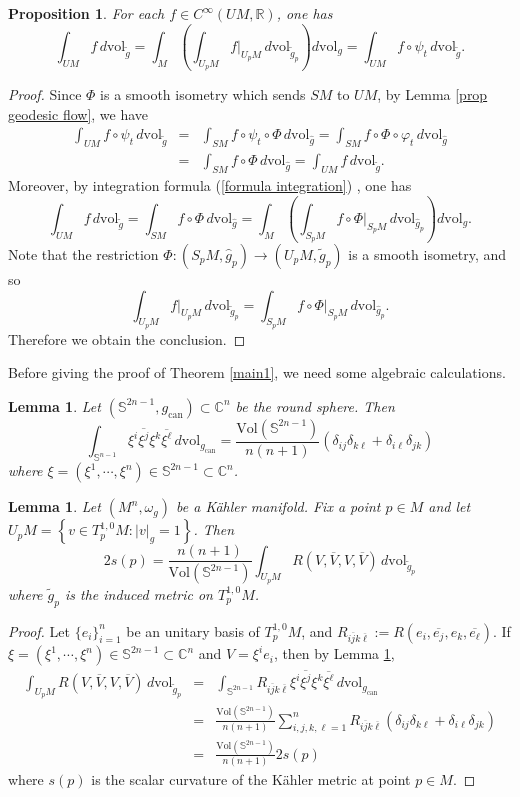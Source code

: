 \documentclass[12pt]{amsart}
\theoremstyle{plain}
\newtheorem{lemma}[thm]{Lemma}
\newtheorem{prop}[thm]{Proposition}
\theoremstyle{definition}
\newcommand{\bproposition}{\begin{prop}}
\newcommand{\eproposition}{\end{prop}}
\newcommand{\bproof}{\begin{proof}}
\newcommand{\eproof}{\end{proof}}
\newcommand{\elemma}{\end{lemma}}
\newcommand{\blemma}{\begin{lemma}}
\renewcommand{\bar}{\overline}
\renewcommand{\phi}{\varphi}
\newcommand{\beq}{\begin{equation}}
\newcommand{\eeq}{\end{equation}}
\newcommand{\ee}{\end{eqnarray*}}
\newcommand{\be}{\begin{eqnarray*}}
\renewcommand{\hat}{\widehat}
\renewcommand{\tilde}{\widetilde}
\renewcommand{\S}{{\mathbb S}}
\renewcommand{\>}{\rightarrow}
\newcommand{\C}{{\mathbb C}}
\newcommand{\R}{{\mathbb R}}
\newcommand{\om}{\omega}
\numberwithin{equation}{section} %
\begin{document}
	
	
	\bproposition\label{complex integration}
	For each $f\in C^\infty(UM, \R)$, one has 
	\beq 
	\int_{UM}f\,d\mathrm{vol}_{\tilde g}=\int_M\left( \int_{U_pM} \left.f\right|_{U_pM}\,d\mathrm{vol}_{\tilde g_p} \right)d\mathrm{vol}_g=\int_{UM}f \circ \psi_t \,d\mathrm{vol}_{\tilde g}.
	\label{formula complex geodesic flow}
	\eeq 
	\eproposition
	
	\bproof
	Since $\Phi$ is a smooth isometry which sends $SM$ to $UM$, by Lemma \ref{prop geodesic flow}, we have
	\be
	\int_{UM}f \circ \psi_t \,d\mathrm{vol}_{\tilde g}
	&=& \int_{SM} f \circ \psi_t \circ\Phi\,d\mathrm{vol}_{\hat g}
	=\int_{SM} f \circ \Phi\circ\phi_t \,d\mathrm{vol}_{\hat g}\\
	&=& \int_{SM} f \circ \Phi \,d\mathrm{vol}_{\hat g}
	= \int_{UM} f  \,d\mathrm{vol}_{\tilde g}.
	\ee
	Moreover, by  integration formula (\ref{formula integration}) , one has 
	\[ 
	\int_{UM} f  \,d\mathrm{vol}_{\tilde g}  
	=\int_{SM} f \circ \Phi \,d\mathrm{vol}_{\hat g}
	=\int_M \left(\int_{S_pM} \left.f\circ \Phi\right|_{S_pM}\,d\mathrm{vol}_{\hat g_p}\right) d\mathrm{vol}_g.
	\] 
	Note   that the restriction $\Phi:(S_pM,\hat g_p)\to (U_pM,\tilde g_p)$ is a smooth isometry, and so
	\[
	\int_{U_pM} \left.f\right|_{U_pM}\,d\mathrm{vol}_{\tilde g_p}
	=\int_{S_pM} \left.f\circ \Phi\right|_{S_pM}\,d\mathrm{vol}_{\hat g_p}.
	\] 
	Therefore we obtain the conclusion.
	\eproof
	
	
	
	\noindent Before giving the proof of Theorem \ref{main1}, we need some  algebraic calculations. 
	
	\blemma\label{lem average}
	Let $(\S^{2n-1},g_{\mathrm{can}})\subset\C^n$ be the round sphere. Then 
	\[ 
	\int_{\S^{n-1}} \xi^i\bar{\xi^j}\xi^k\bar{\xi^\ell}\,d\mathrm{vol}_{g_{\mathrm{can}}}=\frac{\mathrm{Vol}(\S^{2n-1})}{n(n+1)}\left(
	\delta_{ij}\delta_{k\ell}
	+\delta_{i\ell}\delta_{jk}
	\right)
	\] 
	where $\xi=(\xi^1,\cdots,\xi^n)\in \S^{2n-1}\subset \C^n$. 
	\elemma
	
	
	\blemma\label{prop scalar curvature}
	Let $(M^n,\om_g)$ be a K\"ahler manifold. Fix a point $p\in M$ and let $U_pM=\left\{ v\in T^{1,0}_p M:|v|_g=1\right\}$.
	Then 
	\beq 
	2s(p)=\frac{n(n+1)}{\mathrm{Vol}(\S^{2n-1})}\int_{U_pM} R(V,\bar V,V,\bar V)\,d\mathrm{vol}_{\tilde g_p}
	\eeq 
	where $\tilde g_p$  is the induced  metric on $T^{1,0}_pM$.
	\elemma
	\bproof 
	Let $\{e_i\}_{i=1}^{n}$ be an unitary basis of $T^{1,0}_pM$,
	and $R_{i\bar jk\bar \ell}:=R(e_i,\bar{e_j},e_k,\bar{e_\ell})$. If  $\xi=(\xi^1,\cdots,\xi^n)\in \S^{2n-1}\subset \C^n$ and $V=\xi^i e_i$, 
	then by Lemma \ref{lem average},
	\be 
	\int_{U_pM} R(V,\bar V,V,\bar V)\,d\mathrm{vol}_{\tilde g_p}
	&=&\int_{\S^{2n-1}} R_{i\bar jk\bar \ell} \xi^i\bar{\xi^j}\xi^k\bar{\xi^\ell}\,d\mathrm{vol}_{g_{\mathrm{can}}}\\
	&=&\frac{\mathrm{Vol}(\S^{2n-1})}{n(n+1)}\sum_{i,j,k,\ell=1}^{n}R_{i\bar jk\bar \ell} \left(
	\delta_{ij}\delta_{k\ell}
	+\delta_{i\ell}\delta_{jk}
	\right)\\
	&=& \frac{\mathrm{Vol}(\S^{2n-1})}{n(n+1)} 2s(p)
	\ee 
	where $s(p)$ is the scalar curvature of the K\"ahler metric at point $p\in M$. 
	\eproof
	
\end{document}
